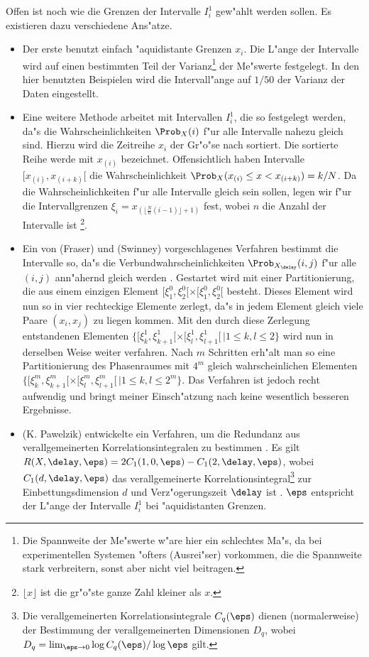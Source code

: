 Offen ist noch wie die Grenzen der Intervalle $I^1_i$ gew"ahlt werden sollen. Es
existieren dazu verschiedene Ans"atze.
\begin{itemize}
\item Der erste benutzt einfach "aquidistante Grenzen $x_i$. Die L"ange der Intervalle
  wird auf einen bestimmten Teil der Varianz\footnote{Die Spannweite der Me"swerte w"are
    hier ein schlechtes Ma"s, da bei experimentellen Systemen "ofters \slang(Ausrei"ser)
    vorkommen, die die Spannweite stark verbreitern, sonst aber nicht viel beitragen.} der
  Me"swerte festgelegt. In den hier benutzten Beispielen wird die Intervall"ange auf
  $1/50$ der Varianz der Daten eingestellt.
\item Eine weitere Methode arbeitet mit Intervallen $I^1_i$, die so festgelegt werden,
  da"s die Wahrscheinlichkeiten $\Prob_X(i)$ f"ur alle Intervalle nahezu gleich sind.
  Hierzu wird die Zeitreihe $x_i$ der Gr"o"se nach sortiert. Die sortierte Reihe werde mit
  $x_{(i)}$ bezeichnet.  Offensichtlich haben Intervalle $[x_{(i)},x_{(i+k)}[$ die
  Wahrscheinlichkeit $\Prob_X(x_{(i)}\leq x<x_{(i+k)})=k/N$. Da die Wahrscheinlichkeiten
  f"ur alle Intervalle gleich sein sollen, legen wir f"ur die Intervallgrenzen
  $\xi_i=x_{(\lfloor\frac{N}{n}(i-1)\rfloor+1)}$ fest, wobei $n$ die Anzahl der Intervalle
  ist \footnote{$\lfloor x \rfloor$ ist die gr"o"ste ganze Zahl kleiner als $x$.}.
\item Ein von \autor(Fraser) und \autor(Swinney) vorgeschlagenes Verfahren bestimmt die
  Intervalle so, da"s die Verbundwahrscheinlichkeiten $\Prob_{X_\delay}(i,j)$ f"ur alle
  $(i,j)$ ann"ahernd gleich werden \cite{Fraser-swinney}. Gestartet wird mit einer
  Partitionierung, die aus einem einzigen Element
  $[\xi^0_1,\xi^0_2[\times[\xi^0_1,\xi^0_2[$ besteht. Dieses Element wird nun so in vier
  rechteckige Elemente zerlegt, da"s in jedem Element gleich viele Paare $(x_i,x_j)$ zu
  liegen kommen. Mit den durch diese Zerlegung entstandenen Elementen $\{
  [\xi^1_k,\xi^1_{k+1} [ \times [\xi^1_l, \xi^1_{l+1} [ \, \vert 1 \leq k , l \leq 2\}$
  wird nun in derselben Weise weiter verfahren. Nach $m$ Schritten erh"alt man so eine
  Partitionierung des Phasenraumes mit $4^m$ gleich wahrscheinlichen Elementen
  $\{[\xi^m_k,\xi^m_{k+1}[\times[\xi^m_l,\xi^m_{l+1}[\,\vert 1\leq k,l \leq 2^m\}$.
  Das Verfahren ist jedoch recht aufwendig und bringt meiner Einsch"atzung nach keine
  wesentlich besseren Ergebnisse.
\item \autor(K. Pawelzik) entwickelte ein Verfahren, um die Redundanz aus
  verallgemeinerten Korrelationsintegralen zu bestimmen \cite{Pawelzik91}.
  Es gilt $R(X,\delay,\eps)=2C_1(1,0,\eps)-C_1(2,\delay,\eps)$, wobei $C_1(d,\delay,\eps)$
  das verallgemeinerte Korrelationsintegral\footnote{Die verallgemeinerten
    Korrelationsintegrale $C_q(\eps)$ dienen (normalerweise) der Bestimmung der verallgemeinerten Dimensionen
    $D_q$, wobei $D_q = \lim_{\eps\to0}\log C_q(\eps)/\log\eps$ gilt. } zur Einbettungsdimension $d$ und 
  Verz"ogerungszeit $\delay$ ist \cite{Pawelzik-schuster}. $\eps$ entspricht der
  L"ange der Intervalle $I_i^1$ bei "aquidistanten Grenzen. 
\end{itemize}


